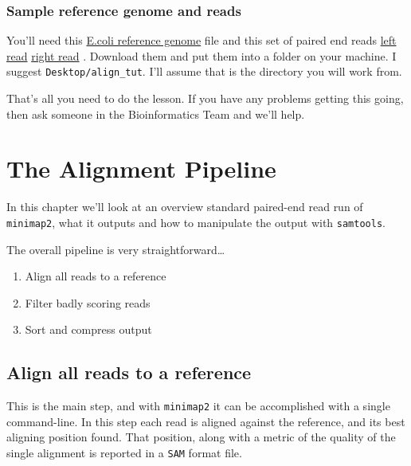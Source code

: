 \documentclass[]{book}
\providecommand{\tightlist}{%
  \setlength{\itemsep}{0pt}\setlength{\parskip}{0pt}}
\begin{document}
\hypertarget{sample-reference-genome-and-reads}{%
\subsection{Sample reference genome and reads}\label{sample-reference-genome-and-reads}}

You'll need this \href{https://github.com/TeamMacLean/basic_alignment/blob/master/sample_data/ecoli_genome.fa}{E.coli reference genome} file and this set of paired end reads \href{https://github.com/TeamMacLean/basic_alignment/blob/master/sample_data/ecoli_left_R1.fq}{left read} \href{https://github.com/TeamMacLean/basic_alignment/blob/master/sample_data/ecoli_right_R2.fq}{right read} . Download them and put them into a folder on your machine. I suggest \texttt{Desktop/align\_tut}. I'll assume that is the directory you will work from.

That's all you need to do the lesson. If you have any problems getting this going, then ask someone in the Bioinformatics Team and we'll help.

\hypertarget{intro}{%
\chapter{The Alignment Pipeline}\label{intro}}

In this chapter we'll look at an overview standard paired-end read run of \texttt{minimap2}, what it outputs and how to manipulate the output with \texttt{samtools}.

The overall pipeline is very straightforward\ldots{}

\begin{enumerate}
\def\labelenumi{\arabic{enumi}.}
\tightlist
\item
  Align all reads to a reference
\item
  Filter badly scoring reads
\item
  Sort and compress output
\end{enumerate}

\hypertarget{align-all-reads-to-a-reference}{%
\section{Align all reads to a reference}\label{align-all-reads-to-a-reference}}

This is the main step, and with \texttt{minimap2} it can be accomplished with a single command-line. In this step each read is aligned against the reference, and its best aligning position found. That position, along with a metric of the quality of the single alignment is reported in a \texttt{SAM} format file.
\end{document}
